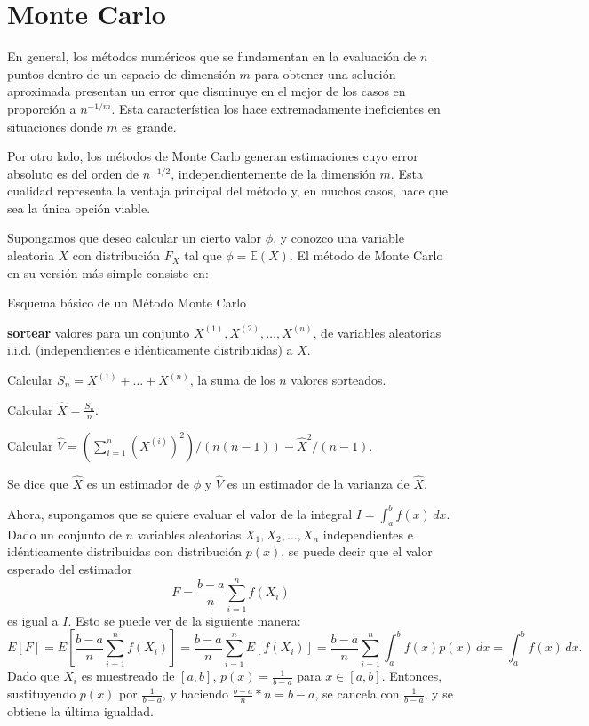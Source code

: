 \documentclass{article}
\begin{document}
\section{Monte Carlo}

En general, los métodos numéricos que se fundamentan en la evaluación de \( n \) puntos dentro de un espacio de dimensión \( m \) para obtener una solución aproximada presentan un error que disminuye en el mejor de los casos en proporción a \( n^{-1/m} \).
Esta característica los hace extremadamente ineficientes en situaciones donde \( m \) es grande.

Por otro lado, los métodos de Monte Carlo generan estimaciones cuyo error absoluto es del orden de \( n^{-1/2} \), independientemente de la dimensión \( m \). Esta cualidad representa la ventaja principal del método y, en muchos casos, hace que sea la única opción viable.

Supongamos que deseo calcular un cierto valor $\phi$, y conozco una variable aleatoria $X$ con distribución $F_X$ tal que $\phi = \mathbb{E}(X)$. El método de Monte Carlo en su versión más simple consiste en:

\begin{algorithm}
\caption{Esquema básico de un Método Monte Carlo}
\begin{algorithmic}[1]

\State \textbf{sortear} valores para un conjunto $X^{(1)}, X^{(2)}, \dots, X^{(n)}$, de variables aleatorias i.i.d. (independientes e idénticamente distribuidas) a $X$.

\State Calcular $S_n = X^{(1)} + \dots + X^{(n)}$, la suma de los $n$ valores sorteados.

\State Calcular $\hat{X} = \frac{S_n}{n}$.

\State Calcular $\hat{V} = \left(\sum_{i=1}^{n} (X^{(i)})^2\right) / (n(n - 1)) - \hat{X}^2 / (n - 1)$.

\end{algorithmic}
\end{algorithm}

Se dice que $\hat{X}$ es un estimador de $\phi$ y $\hat{V}$ es un estimador de la varianza de $\hat{X}$.

Ahora, supongamos que se quiere evaluar el valor de la integral $I = \int_{a}^{b} f(x) \,dx$. Dado un conjunto de $n$ variables aleatorias $X_1, X_2, \dots, X_n$ independientes e idénticamente distribuidas con distribución $p(x)$, se puede decir que el valor esperado del estimador
$$F = \frac{b-a}{n} \sum_{i=1}^{n} f(X_i)$$
es igual a $I$. Esto se puede ver de la siguiente manera:
$$E[F] = E\left[\frac{b-a}{n} \sum_{i=1}^{n} f(X_i)\right] = \frac{b-a}{n} \sum_{i=1}^{n} E[f(X_i)] = \frac{b-a}{n} \sum_{i=1}^{n} \int_{a}^{b} f(x) p(x) \,dx = \int_{a}^{b} f(x) \,dx.$$
Dado que $X_i$ es muestreado de $[a,b]$, $p(x) = \frac{1}{b-a}$ para $x \in [a,b]$. Entonces, sustituyendo $p(x)$ por $\frac{1}{b-a}$, y haciendo $\frac{b-a}{n} * n = b-a$, se cancela con $\frac{1}{b-a}$, y se obtiene la última igualdad.
\end{document}
